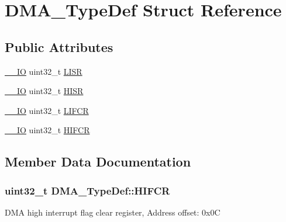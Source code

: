\hypertarget{struct_d_m_a___type_def}{}\section{D\+M\+A\+\_\+\+Type\+Def Struct Reference}
\label{struct_d_m_a___type_def}
\subsection*{Public Attributes}
\begin{DoxyCompactItemize}
\item 
\hyperlink{core__sc300_8h_aec43007d9998a0a0e01faede4133d6be}{\+\_\+\+\_\+\+IO} uint32\+\_\+t \hyperlink{struct_d_m_a___type_def_aacb4a0977d281bc809cb5974e178bc2b}{L\+I\+SR}
\item 
\hyperlink{core__sc300_8h_aec43007d9998a0a0e01faede4133d6be}{\+\_\+\+\_\+\+IO} uint32\+\_\+t \hyperlink{struct_d_m_a___type_def_a01a90a5fcd6459e10b81c0ab737dd2e3}{H\+I\+SR}
\item 
\hyperlink{core__sc300_8h_aec43007d9998a0a0e01faede4133d6be}{\+\_\+\+\_\+\+IO} uint32\+\_\+t \hyperlink{struct_d_m_a___type_def_a11adb689c874d38b49fa44990323b653}{L\+I\+F\+CR}
\item 
\hyperlink{core__sc300_8h_aec43007d9998a0a0e01faede4133d6be}{\+\_\+\+\_\+\+IO} uint32\+\_\+t \hyperlink{struct_d_m_a___type_def_a1e4f50b935bab2520788ae936f2e55c1}{H\+I\+F\+CR}
\end{DoxyCompactItemize}


\subsection{Member Data Documentation}
\subsubsection[{\texorpdfstring{H\+I\+F\+CR}{HIFCR}}]{ uint32\+\_\+t D\+M\+A\+\_\+\+Type\+Def\+::\+H\+I\+F\+CR}\hypertarget{struct_d_m_a___type_def_a1e4f50b935bab2520788ae936f2e55c1}{}\label{struct_d_m_a___type_def_a1e4f50b935bab2520788ae936f2e55c1}
D\+MA high interrupt flag clear register, Address offset\+: 0x0C 
